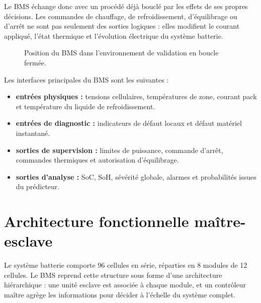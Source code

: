 \noindent
Le BMS échange donc avec un procédé déjà bouclé par les effets de ses propres décisions. Les commandes de chauffage, de refroidissement, d'équilibrage ou d'arrêt ne sont pas seulement des sorties logiques : elles modifient le courant appliqué, l'état thermique et l'évolution électrique du système batterie.

\begin{figure}[H]
  \centering
  \captionsetup{width=0.84\textwidth, skip=15pt}
  \caption{Position du BMS dans l'environnement de validation en boucle fermée.}
  \label{fig:ch4_position_bms}
\end{figure}

\noindent
Les interfaces principales du BMS sont les suivantes :
\begin{itemize}
  \item \textbf{entrées physiques :} tensions cellulaires, températures de zone, courant pack et température du liquide de refroidissement.
  \item \textbf{entrées de diagnostic :} indicateurs de défaut locaux et défaut matériel instantané.
  \item \textbf{sorties de supervision :} limites de puissance, commande d'arrêt, commandes thermiques et autorisation d'équilibrage.
  \item \textbf{sorties d'analyse :} SoC, SoH, sévérité globale, alarmes et probabilités issues du prédicteur.
\end{itemize}

\section{Architecture fonctionnelle maître-esclave}
\label{sec:ch4_architecture_fonctionnelle}

Le système batterie comporte 96 cellules en série, réparties en 8 modules de 12 cellules. Le BMS reprend cette structure sous forme d'une architecture hiérarchique : une unité esclave est associée à chaque module, et un contrôleur maître agrège les informations pour décider à l'échelle du système complet.


